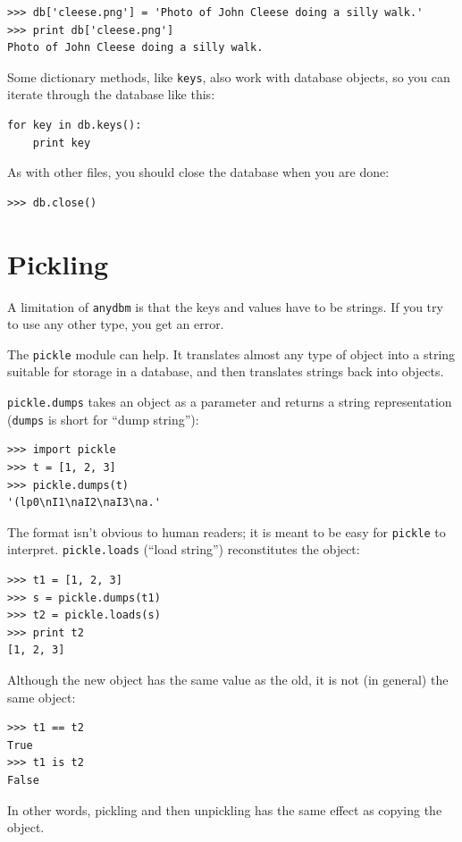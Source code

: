 \documentclass[10pt]{book}
\begin{document}
\begin{verbatim}
>>> db['cleese.png'] = 'Photo of John Cleese doing a silly walk.'
>>> print db['cleese.png']
Photo of John Cleese doing a silly walk.
\end{verbatim}
%
Some dictionary methods, like {\tt keys}, also
work with database objects, so you can iterate through the database
like this:

\begin{verbatim}
for key in db.keys():
    print key
\end{verbatim}
%
As with other files, you should close the database when you are
done:

\begin{verbatim}
>>> db.close()
\end{verbatim}
%


\section{Pickling}

A limitation of {\tt anydbm} is that the keys and values have
to be strings.  If you try to use any other type, you get an
error.

The {\tt pickle} module can help.  It translates
almost any type of object into a string suitable for storage in a
database, and then translates strings back into objects.

{\tt pickle.dumps} takes an object as a parameter and returns
a string representation ({\tt dumps} is short for ``dump string''):

\begin{verbatim}
>>> import pickle
>>> t = [1, 2, 3]
>>> pickle.dumps(t)
'(lp0\nI1\naI2\naI3\na.'
\end{verbatim}
%
The format isn't obvious to human readers; it is meant to be
easy for {\tt pickle} to interpret.  {\tt pickle.loads}
(``load string'') reconstitutes the object:

\begin{verbatim}
>>> t1 = [1, 2, 3]
>>> s = pickle.dumps(t1)
>>> t2 = pickle.loads(s)
>>> print t2
[1, 2, 3]
\end{verbatim}
%
Although the new object has the same value as the old, it is
not (in general) the same object:

\begin{verbatim}
>>> t1 == t2
True
>>> t1 is t2
False
\end{verbatim}
%
In other words, pickling and then unpickling has the same effect
as copying the object.
\end{document}
